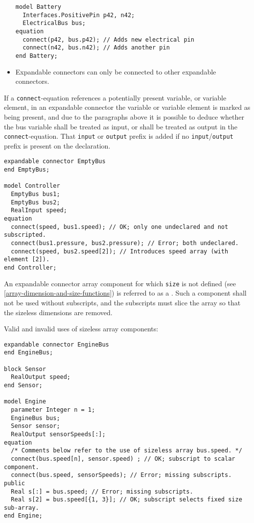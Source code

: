 \begin{itemize}
\begin{example}
\begin{lstlisting}[language=modelica]
model Battery
  Interfaces.PositivePin p42, n42;
  ElectricalBus bus;
equation
  connect(p42, bus.p42); // Adds new electrical pin
  connect(n42, bus.n42); // Adds another pin
end Battery;
\end{lstlisting}
\end{example}

\item
  Expandable connectors can only be connected to other expandable connectors.
\end{itemize}

If a \lstinline!connect!-equation references a potentially present variable, or variable element, in an expandable connector the variable or variable element is marked as being present, and due to the paragraphs above it is possible to deduce whether the bus variable shall be treated as input, or shall be treated as output in the \lstinline!connect!-equation.
That \lstinline!input! or \lstinline!output! prefix is added if no \lstinline!input!/\lstinline!output! prefix is present on the declaration.

\begin{example}
\begin{lstlisting}[language=modelica]
expandable connector EmptyBus
end EmptyBus;

model Controller
  EmptyBus bus1;
  EmptyBus bus2;
  RealInput speed;
equation
  connect(speed, bus1.speed); // OK; only one undeclared and not subscripted.
  connect(bus1.pressure, bus2.pressure); // Error; both undeclared.
  connect(speed, bus2.speed[2]); // Introduces speed array (with element [2]).
end Controller;
\end{lstlisting}
\end{example}

An expandable connector array component for which \lstinline!size! is not defined (see \cref{array-dimension-and-size-functions}) is referred to as a .
Such a component shall not be used without subscripts, and the subscripts must slice the array so that the sizeless dimensions are removed.

\begin{example}
Valid and invalid uses of sizeless array components:
\begin{lstlisting}[language=modelica]
expandable connector EngineBus
end EngineBus;

block Sensor
  RealOutput speed;
end Sensor;

model Engine
  parameter Integer n = 1;
  EngineBus bus;
  Sensor sensor;
  RealOutput sensorSpeeds[:];
equation
  /* Comments below refer to the use of sizeless array bus.speed. */
  connect(bus.speed[n], sensor.speed) ; // OK; subscript to scalar component.
  connect(bus.speed, sensorSpeeds); // Error; missing subscripts.
public
  Real s[:] = bus.speed; // Error; missing subscripts.
  Real s[2] = bus.speed[{1, 3}]; // OK; subscript selects fixed size sub-array.
end Engine;
\end{lstlisting}
\end{example}

